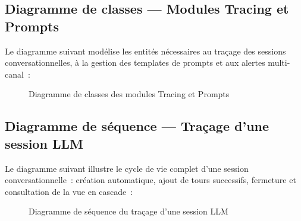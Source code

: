 \subsection{Diagramme de classes --- Modules Tracing et Prompts}

Le diagramme suivant modélise les entités nécessaires au traçage des sessions conversationnelles, à la gestion des templates de prompts et aux alertes multi-canal~:

\begin{figure}[H]
    \centering
    \caption{Diagramme de classes des modules Tracing et Prompts}
    \label{fig:class_tracing}
\end{figure}

\subsection{Diagramme de séquence --- Traçage d'une session LLM}

Le diagramme suivant illustre le cycle de vie complet d'une session conversationnelle~: création automatique, ajout de tours successifs, fermeture et consultation de la vue en cascade~:

\begin{figure}[H]
    \centering
    \caption{Diagramme de séquence du traçage d'une session LLM}
    \label{fig:seq_tracing}
\end{figure}

